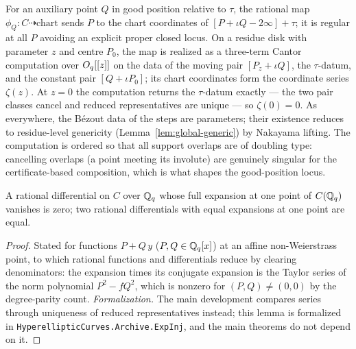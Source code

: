 \begin{definition}
\label{def:phiD}
\leanok
{}
For an auxiliary point $Q$ in good position relative to $\tau$, the rational map
$\phi_Q \colon C \dashrightarrow \text{chart}$ sends $P$ to the chart coordinates of
$[P + \iota Q - 2\infty] + \tau$; it is regular at all $P$ avoiding an explicit proper
closed locus. On a residue disk with parameter $z$ and centre $P_0$, the map is
realized as a three-term Cantor computation over $O_q[[z]]$ on the data of the moving
pair $[P_z + \iota Q]$, the $\tau$-datum, and the constant pair $[Q + \iota P_0]$; its
chart coordinates form the coordinate series $\zeta(z)$. At $z = 0$ the computation
returns the $\tau$-datum exactly --- the two pair classes cancel and reduced
representatives are unique --- so $\zeta(0) = 0$. As everywhere, the B\'ezout data of
the steps are parameters; their existence reduces to residue-level genericity
(Lemma~\ref{lem:global-generic}) by Nakayama lifting. The computation is ordered so
that all support overlaps are of doubling type: cancelling overlaps (a point meeting
its involute) are genuinely singular for the certificate-based composition, which is
what shapes the good-position locus.
\end{definition}

\begin{lemma}
\label{lem:exp-inj}
\leanok
{}
A rational differential on $C$ over $\mathbb{Q}_q$ whose full expansion at one point of
$C(\mathbb{Q}_q)$ vanishes is zero; two rational differentials with equal expansions at one
point are equal.
\end{lemma}
\begin{proof}
\leanok
Stated for functions $P + Q\,y$ ($P, Q \in \mathbb{Q}_q[x]$) at an affine non-Weierstrass point,
to which rational functions and differentials reduce by clearing denominators: the
expansion times its conjugate expansion is the Taylor series of the norm polynomial
$P^2 - fQ^2$, which is nonzero for $(P,Q) \neq (0,0)$ by the degree-parity count.
\emph{Formalization.} The main development compares series through uniqueness of
reduced representatives instead; this lemma is formalized in
\texttt{HyperellipticCurves.Archive.ExpInj}, and the main theorems do not depend on it.
\end{proof}


